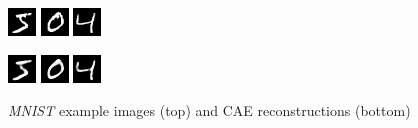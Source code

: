 \documentclass{article}
\begin{document}
    \begin{figure}[h]
        \centering
        \includegraphics[width=0.1\linewidth]{../graphics/reconstructions/mnist/input_00.png}
        \includegraphics[width=0.1\linewidth]{../graphics/reconstructions/mnist/input_01.png}
        \includegraphics[width=0.1\linewidth]{../graphics/reconstructions/mnist/input_02.png}

        \includegraphics[width=0.1\linewidth]{../graphics/reconstructions/mnist/reconstruction_00.png}
        \includegraphics[width=0.1\linewidth]{../graphics/reconstructions/mnist/reconstruction_01.png}
        \includegraphics[width=0.1\linewidth]{../graphics/reconstructions/mnist/reconstruction_02.png}

        \caption{\emph{MNIST} example images (top) and CAE reconstructions (bottom)}
        \label{fig:mnist_reconstructions}
      \end{figure}
\end{document}
